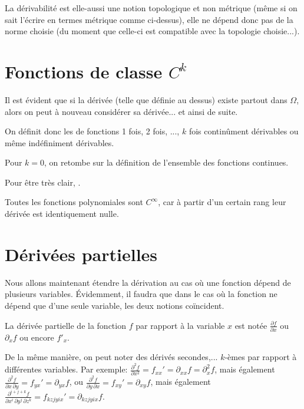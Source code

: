 \ifVersionDuDocEstVincent\medskip\fi
La dérivabilité est elle-aussi une notion topologique et non métrique (même si on sait
l'écrire en termes métrique comme ci-dessus), elle ne dépend donc pas
de la norme choisie (du moment que celle-ci est compatible avec la topologie choisie...).

\ifVersionDuDocEstVincent\medskip\fi
\section{Fonctions de classe $C^k$}

\ifVersionDuDocEstVincent\medskip\fi
Il est évident que si la dérivée (telle que définie au dessus) existe partout dans
$\Omega$, alors on peut à nouveau considérer sa dérivée... et ainsi de suite.

On définit donc les 
de fonctions 1 fois, 2 fois, ..., $k$ fois continûment dérivables ou même indéfiniment
dérivables.

\ifVersionDuDocEstVincent\medskip\fi
Pour $k=0$, on retombe sur la définition de l'ensemble des fonctions
continues.

Pour être très clair, .

Toutes les fonctions polynomiales sont $C^\infty$, car à partir d'un certain rang
leur dérivée est identiquement nulle.

\ifVersionDuDocEstVincent\medskip\fi
\section{Dérivées partielles}
Nous allons maintenant étendre la dérivation au cas où une fonction dépend
de plusieurs variables.
Évidemment, il faudra que dans le cas où la fonction ne dépend que d'une seule
variable, les deux notions coïncident.

\ifVersionDuDocEstVincent\medskip\fi
{}

\ifVersionDuDocEstVincent\medskip\fi
La dérivée partielle de la fonction $f$ par rapport à la variable $x$ est notée
$\frac{ \partial f }{ \partial x }$ ou $\partial_x f$ ou encore $f'_x$.

\ifVersionDuDocEstVincent\medskip\fi
De la même manière, on peut noter des dérivés secondes,... $k$-èmes par
rapport à différentes variables.
Par exemple: $\frac{ \partial^2 f}{ \partial x^2} = f_{xx}' = \partial_{xx} f = \partial^2_x f$,
mais également $\frac{ \partial^2 f}{\partial x\,\partial y} = f_{yx}' = \partial_{yx} f$, ou
$\frac{ \partial^2 f}{\partial y\,\partial x} = f_{xy}' = \partial_{xy} f $, mais également
$\frac{ \partial^{i+j+k} f}{ \partial x^i\, \partial y^j\, \partial z^k } = f_{kz jy ix}' = \partial_{kz jy ix} f $.

